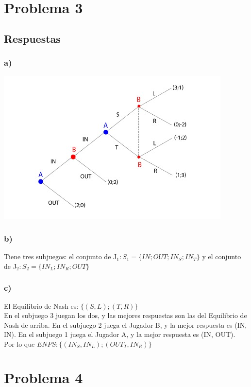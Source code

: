 \documentclass{article}
\begin{document}
    \newpage

    \section*{Problema 3}
        \subsection*{Respuestas}
            \subsubsection*{a)}
                \begin{center}
                    \includegraphics[width=0.5 \linewidth]{figs/fig17.jpeg}
                \end{center}

            \subsubsection*{b)}
                Tiene tres subjuegos: el conjunto de J$_{1}: S_{1} = \{IN; OUT; IN _{S}; IN_{T}\}$ y el conjunto de J$_{2}: S_{2} = \{IN_{L}; IN _{R}; OUT\}$ 

            \subsubsection*{c)}
                El Equilibrio de Nash es: $\{(S,L);(T,R)\}$
                \\
                En el subjuego 3 juegan los dos, y las mejores respuestas son las del Equilibrio de Nash de arriba. En el subjuego 2 juega el Jugador B, y la mejor respuesta es (IN, IN). En el subjuego 1 juega el Jugador A, y la mejor respuesta es (IN, OUT).
                \\
                Por lo que $ENPS:\{(IN_{S}, IN_{L});(OUT_{T}, IN_{R})\}$
    \newpage

    \section*{Problema 4}
\end{document}

